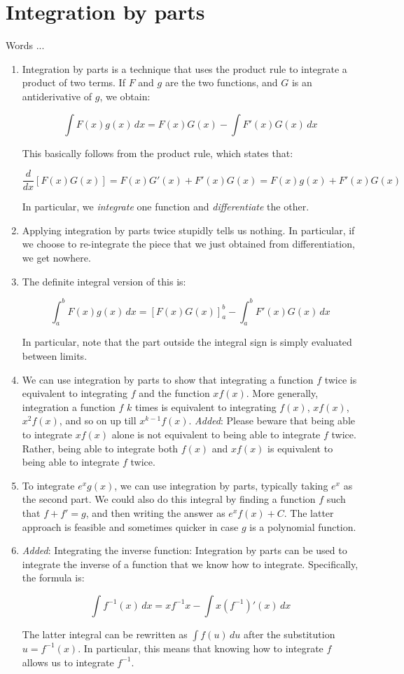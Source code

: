 \documentclass[10pt]{amsart}
\begin{document}
\section{Integration by parts}

Words ...

\begin{enumerate}

\item Integration by parts is a technique that uses the product rule
  to integrate a product of two terms. If $F$ and $g$ are the two
  functions, and $G$ is an antiderivative of $g$, we obtain:

  $$\int F(x) g(x) \, dx = F(x)G(x) - \int F'(x) G(x) \, dx$$

  This basically follows from the product rule, which states that:

  $$\frac{d}{dx} [F(x)G(x)] = F(x)G'(x) + F'(x)G(x) = F(x)g(x) + F'(x)G(x)$$

  In particular, we {\em integrate} one function and {\em
  differentiate} the other.
\item Applying integration by parts twice stupidly tells us
  nothing. In particular, if we choose to re-integrate the piece that
  we just obtained from differentiation, we get nowhere.
\item The definite integral version of this is:

  $$\int_a^b F(x) g(x) \, dx = [F(x)G(x)]_a^b - \int_a^b F'(x) G(x) \, dx$$

  In particular, note that the part outside the integral sign is
  simply evaluated between limits.

\item We can use integration by parts to show that integrating a
  function $f$ twice is equivalent to integrating $f$ and the function
  $xf(x)$. More generally, integration a function $f$ $k$ times is
  equivalent to integrating $f(x)$, $xf(x)$, $x^2f(x)$, and so on up
  till $x^{k-1}f(x)$. {\em Added}: Please beware that being able to
  integrate $xf(x)$ alone is not equivalent to being able to integrate
  $f$ twice. Rather, being able to integrate both $f(x)$ and $xf(x)$
  is equivalent to being able to integrate $f$ twice.
\item To integrate $e^xg(x)$, we can use integration by parts,
  typically taking $e^x$ as the second part. We could also do this
  integral by finding a function $f$ such that $f + f' = g$, and then
  writing the answer as $e^x f(x) + C$. The latter approach is
  feasible and sometimes quicker in case $g$ is a polynomial function.
\item {\em Added}: Integrating the inverse function: Integration by
  parts can be used to integrate the inverse of a function that we know
  how to integrate. Specifically, the formula is:

  $$\int f^{-1}(x) \, dx = xf^{-1}x - \int x(f^{-1})'(x) \, dx$$

  The latter integral can be rewritten as $\int f(u) \, du$ after the
  substitution $u =f^{-1}(x)$. In particular, this means that knowing
  how to integrate $f$ allows us to integrate $f^{-1}$.
\end{enumerate}
\end{document}
